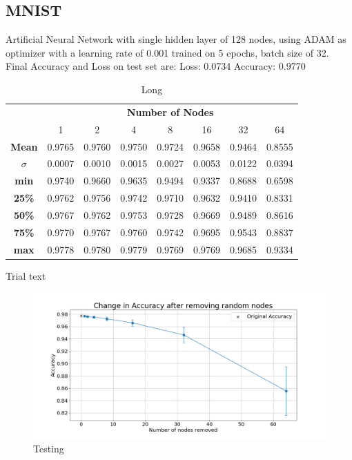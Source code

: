 \documentclass[UKenglish]{ifimaster}
\begin{document}
        \subsection{MNIST}
            Artificial Neural Network with single hidden layer of 128 nodes, using ADAM as optimizer with a learning rate of 0.001 trained on 5 epochs, batch size of 32.
            Final Accuracy and Loss on test set are:
            Loss: 0.0734
            Accuracy: 0.9770
            \begin{table}[h!]
                \centering
                \begin{tabular}{c | c c c c c c c}
                    & \multicolumn{7}{c}{\textbf{Number of Nodes}} \\
                    \cline{2-8}
                    & 1 & 2 & 4 & 8 & 16 & 32 & 64 \\
                    \hline
                    \textbf{Mean} & 0.9765 & 0.9760 & 0.9750 & 0.9724 & 0.9658 & 0.9464 & 0.8555 \\
                    \textbf{$\sigma$} & 0.0007 & 0.0010 & 0.0015 & 0.0027 & 0.0053 & 0.0122 & 0.0394 \\
                    \textbf{min} & 0.9740 & 0.9660 & 0.9635 & 0.9494 & 0.9337 & 0.8688 & 0.6598 \\
                    \textbf{25\%} & 0.9762 & 0.9756 & 0.9742 & 0.9710 & 0.9632 & 0.9410 & 0.8331 \\
                    \textbf{50\%} & 0.9767 & 0.9762 & 0.9753 & 0.9728 & 0.9669 & 0.9489 & 0.8616 \\
                    \textbf{75\%} & 0.9770 & 0.9767 & 0.9760 & 0.9742 & 0.9695 & 0.9543 & 0.8837 \\
                    \textbf{max} & 0.9778 & 0.9780 & 0.9779 & 0.9769 & 0.9769 & 0.9685 & 0.9334 \\
                    
                \end{tabular}
                \caption[Short]{Long}
            \end{table}

            Trial text

            \begin{figure}[h!]\centering
                \includegraphics[width=\textwidth]{Accuracy_change_random_removal_mnist.png}
                \caption[Short title]{Testing}
                \label{fig:acc_rn_mnist}
            \end{figure}
\end{document}
